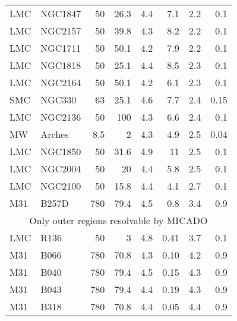 \documentclass{aa}
\begin{document}
\begin{appendix}
\begin{table*}
\begin{tabular}{l l r r r r r r}
        \hline
        LMC    & NGC1847      & 50       & 26.3 & 4.4       & 7.1     & 2.2            & 0.1           \\
        LMC    & NGC2157      & 50       & 39.8 & 4.3       & 8.2     & 2.2            & 0.1           \\
        LMC    & NGC1711      & 50       & 50.1 & 4.2       & 7.9     & 2.2            & 0.1           \\
        LMC    & NGC1818      & 50       & 25.1 & 4.4       & 8.5     & 2.3            & 0.1           \\
        LMC    & NGC2164      & 50       & 50.1 & 4.2       & 6.1     & 2.3            & 0.1           \\
        SMC    & NGC330       & 63       & 25.1 & 4.6       & 7.7     & 2.4            & 0.15          \\
        LMC    & NGC2136      & 50       & 100  & 4.3       & 6.6     & 2.4            & 0.1           \\
        MW     & Arches       & 8.5      & 2    & 4.3       & 4.9     & 2.5            & 0.04          \\
        LMC    & NGC1850      & 50       & 31.6 & 4.9       & 11      & 2.5            & 0.1           \\
        LMC    & NGC2004      & 50       & 20   & 4.4       & 5.8     & 2.5            & 0.1           \\
        LMC    & NGC2100      & 50       & 15.8 & 4.4       & 4.1     & 2.7            & 0.1           \\
        M31    & B257D        & 780      & 79.4 & 4.5       & 0.8     & 3.4            & 0.9           \\
        \hline
        \multicolumn{8}{c}{Only outer regions resolvable by MICADO}                                    \\
        \hline
        LMC    & R136         & 50       & 3    & 4.8       & 0.41    & 3.7            & 0.1           \\
        M31    & B066         & 780      & 70.8 & 4.3       & 0.10    & 4.2            & 0.9           \\
        M31    & B040         & 780      & 79.4 & 4.5       & 0.15    & 4.3            & 0.9           \\
        M31    & B043         & 780      & 79.4 & 4.4       & 0.19    & 4.3            & 0.9           \\
        M31    & B318         & 780      & 70.8 & 4.4       & 0.05    & 4.4            & 0.9           \\

\end{tabular}
\end{table*}
\end{appendix}
\end{document}
